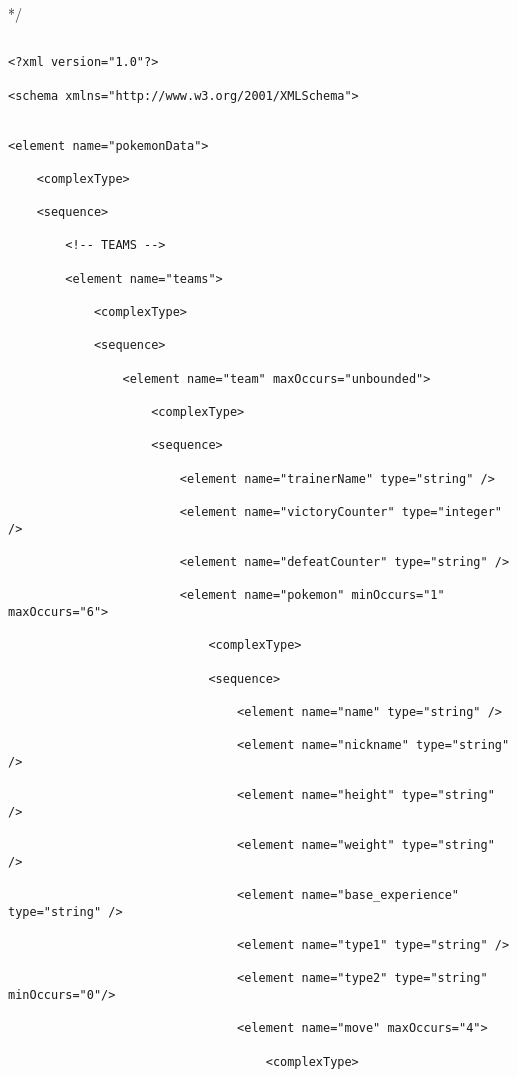 */

\begin{lstlisting}[style=XML]

<?xml version="1.0"?>

<schema xmlns="http://www.w3.org/2001/XMLSchema">


<element name="pokemonData">

    <complexType>

    <sequence>

        <!-- TEAMS -->

        <element name="teams">

            <complexType>

            <sequence>

                <element name="team" maxOccurs="unbounded">

                    <complexType>

                    <sequence>

                        <element name="trainerName" type="string" />

                        <element name="victoryCounter" type="integer" />

                        <element name="defeatCounter" type="string" />

                        <element name="pokemon" minOccurs="1" maxOccurs="6">

                            <complexType>

                            <sequence>

                                <element name="name" type="string" />

                                <element name="nickname" type="string" />

                                <element name="height" type="string" />

                                <element name="weight" type="string" />

                                <element name="base_experience" type="string" />

                                <element name="type1" type="string" />

                                <element name="type2" type="string" minOccurs="0"/>

                                <element name="move" maxOccurs="4">

                                    <complexType>


\end{lstlisting}
